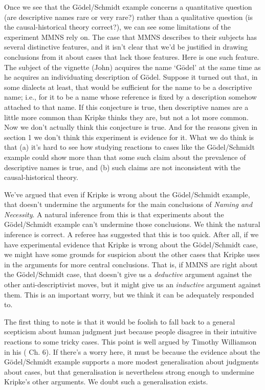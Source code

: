 \documentclass[
  11pt,
  letterpaper,
  DIV=11,
  numbers=noendperiod,
  twoside]{scrartcl}
\begin{document}
Once we see that the Gödel/Schmidt example concerns a quantitative
question (are descriptive names rare or very rare?) rather than a
qualitative question (is the causal-historical theory correct?), we can
see some limitations of the experiment MMNS rely on. The case that MMNS
describes to their subjects has several distinctive features, and it
isn't clear that we'd be justified in drawing conclusions from it about
cases that lack those features. Here is one such feature. The subject of
the vignette (John) acquires the name `Gödel' at the same time as he
acquires an individuating description of Gödel. Suppose it turned out
that, in some dialects at least, that would be sufficient for the name
to be a descriptive name; i.e., for it to be a name whose reference is
fixed by a description somehow attached to that name. If this conjecture
is true, then descriptive names are a little more common than Kripke
thinks they are, but not a lot more common. Now we don't actually think
this conjecture is true. And for the reasons given in section 1 we don't
think this experiment is evidence for it. What we do think is that (a)
it's hard to see how studying reactions to cases like the Gödel/Schmidt
example could show more than that some such claim about the prevalence
of descriptive names is true, and (b) such claims are not inconsistent
with the causal-historical theory.

We've argued that even if Kripke is wrong about the Gödel/Schmidt
example, that doesn't undermine the arguments for the main conclusions
of \emph{Naming and Necessity}. A natural inference from this is that
experiments about the Gödel/Schmidt example can't undermine those
conclusions. We think the natural inference is correct. A referee has
suggested that this is too quick. After all, if we have experimental
evidence that Kripke is wrong about the Gödel/Schmidt case, we might
have some grounds for suspicion about the other cases that Kripke uses
in the arguments for more central conclusions. That is, if MMNS are
right about the Gödel/Schmidt case, that doesn't give us a
\emph{deductive} argument against the other anti-descriptivist moves,
but it might give us an \emph{inductive} argument against them. This is
an important worry, but we think it can be adequately responded to.

The first thing to note is that it would be foolish to fall back to a
general scepticism about human judgment just because people disagree in
their intuitive reactions to some tricky cases. This point is well
argued by Timothy Williamson in his
( Ch. 6). If there's a
worry here, it must be because the evidence about the Gödel/Schmidt
example supports a more modest generalisation about judgments about
cases, but that generalisation is nevertheless strong enough to
undermine Kripke's other arguments. We doubt such a generalisation
exists.
\end{document}
